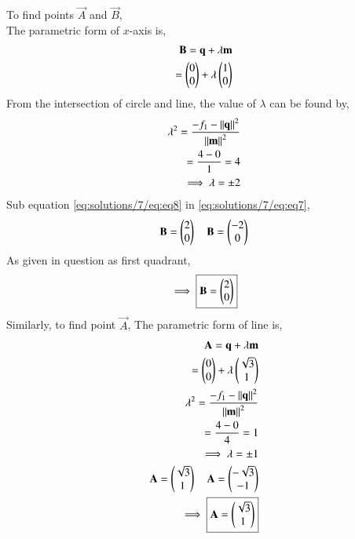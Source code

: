 To find points $\vec{A}$ and $\vec{B}$,\\
The parametric form of $x$-axis is,
\begin{align}
    \mathbf{B} = \mathbf{q}+\lambda\mathbf{m}\\
=\begin{pmatrix}0\\0\end{pmatrix}+\lambda\begin{pmatrix}1\\0\end{pmatrix} \label{eq:solutions/7/eq:eq7}
\end{align}
From the intersection of circle and line, the value of $\lambda$ can be found by,
\begin{align}
    \lambda^2 = \frac{-f_1-\left\lVert\mathbf{q}\right\rVert^2}{\left\lVert\mathbf{m}\right\rVert^2}\\
                = \frac{4-0}{1} = 4\\
    \implies \lambda = \pm{2} \label{eq:solutions/7/eq:eq8}
\end{align}
Sub equation \eqref{eq:solutions/7/eq:eq8} in \eqref{eq:solutions/7/eq:eq7},
\begin{align}
    \mathbf{B} = \begin{pmatrix}2\\0\end{pmatrix}\quad \mathbf{B} = \begin{pmatrix}-2\\0\end{pmatrix} \label{eq:solutions/7/eq:eq9}
\end{align}
As given in question as first quadrant,
\begin{align}
    \implies \boxed{\mathbf{B} = \begin{pmatrix}2\\0\end{pmatrix}} \label{eq:solutions/7/eq:eq10}
\end{align}
Similarly, to find point $\vec{A}$,
The parametric form of line is,
\begin{align}
    \mathbf{A} = \mathbf{q}+\lambda\mathbf{m}\\
            = \begin{pmatrix}0\\0\end{pmatrix}+\lambda\begin{pmatrix}\sqrt{3}\\1\end{pmatrix}\\
    \lambda^2 = \frac{-f_1-\left\lVert\mathbf{q}\right\rVert^2}{\left\lVert\mathbf{m}\right\rVert^2}\\
                = \frac{4-0}{4} = 1\\
    \implies \lambda = \pm{1} \label{eq:solutions/7/eq:eq11}\\
    \mathbf{A} = \begin{pmatrix}\sqrt{3}\\1\end{pmatrix}\quad \mathbf{A} = \begin{pmatrix}-\sqrt{3}\\-1\end{pmatrix}\label{eq:solutions/7/eq:eq12}\\
\implies\boxed{\mathbf{A}=\begin{pmatrix}\sqrt{3}\\1\end{pmatrix}}
\end{align}
